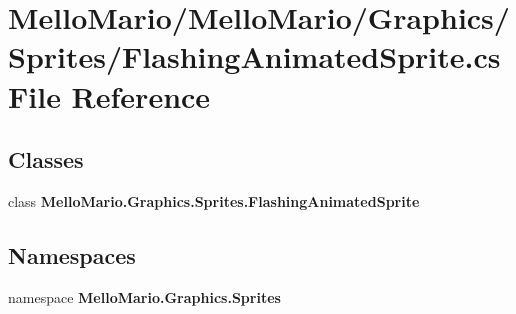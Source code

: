 \section{Mello\+Mario/\+Mello\+Mario/\+Graphics/\+Sprites/\+Flashing\+Animated\+Sprite.cs File Reference}
\label{FlashingAnimatedSprite_8cs}
\subsection*{Classes}
\begin{DoxyCompactItemize}
\item 
class \textbf{ Mello\+Mario.\+Graphics.\+Sprites.\+Flashing\+Animated\+Sprite}
\end{DoxyCompactItemize}
\subsection*{Namespaces}
\begin{DoxyCompactItemize}
\item 
namespace \textbf{ Mello\+Mario.\+Graphics.\+Sprites}
\end{DoxyCompactItemize}
